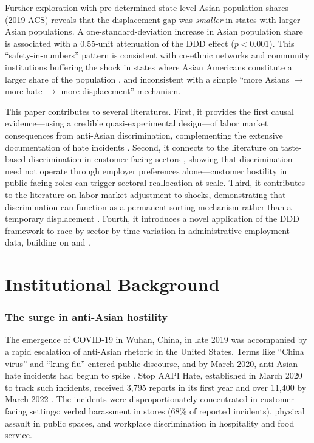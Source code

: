 \documentclass[12pt]{article}
\begin{document}
Further exploration with pre-determined state-level Asian population shares (2019 ACS) reveals that the displacement gap was \textit{smaller} in states with larger Asian populations. A one-standard-deviation increase in Asian population share is associated with a 0.55-unit attenuation of the DDD effect ($p < 0.001$). This ``safety-in-numbers'' pattern is consistent with co-ethnic networks and community institutions buffering the shock in states where Asian Americans constitute a larger share of the population \citep{munshi2003networks, beaman2012social}, and inconsistent with a simple ``more Asians $\rightarrow$ more hate $\rightarrow$ more displacement'' mechanism.

This paper contributes to several literatures. First, it provides the first causal evidence---using a credible quasi-experimental design---of labor market consequences from anti-Asian discrimination, complementing the extensive documentation of hate incidents \citep{jeung2021stop, han2023anti, gover2020anti}. Second, it connects to the literature on taste-based discrimination in customer-facing sectors \citep{becker1957, holzer1998customer, charles2008prejudice}, showing that discrimination need not operate through employer preferences alone---customer hostility in public-facing roles can trigger sectoral reallocation at scale. Third, it contributes to the literature on labor market adjustment to shocks, demonstrating that discrimination can function as a permanent sorting mechanism rather than a temporary displacement \citep{autor2014polanyi, cortes2020heterogeneous}. Fourth, it introduces a novel application of the DDD framework to race-by-sector-by-time variation in administrative employment data, building on \citet{gruber1994incidence} and \citet{olden2022triple}.

\section{Institutional Background}

\subsubsection*{The surge in anti-Asian hostility} The emergence of COVID-19 in Wuhan, China, in late 2019 was accompanied by a rapid escalation of anti-Asian rhetoric in the United States. Terms like ``China virus'' and ``kung flu'' entered public discourse, and by March 2020, anti-Asian hate incidents had begun to spike \citep{gover2020anti}. Stop AAPI Hate, established in March 2020 to track such incidents, received 3,795 reports in its first year and over 11,400 by March 2022 \citep{jeung2021stop}. The incidents were disproportionately concentrated in customer-facing settings: verbal harassment in stores (68\% of reported incidents), physical assault in public spaces, and workplace discrimination in hospitality and food service.
\end{document}
